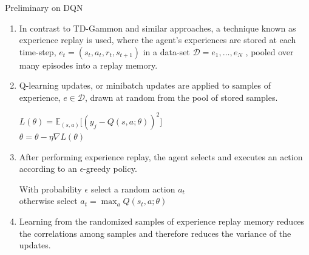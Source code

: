 \begin{frame}{Preliminary on DQN \cite{DBLP:journals/corr/MnihKSGAWR13}}
\begin{enumerate}
    \item In contrast to TD-Gammon and similar approaches, a technique known as experience replay is used, where the agent’s experiences are stored at each time-step, $e_t = (s_t, a_t, r_t, s_{t+1})$ in a data-set $\mathcal{D} = e_1, \dots, e_N$ , pooled over many episodes into a replay memory.
    \item Q-learning updates, or minibatch updates are applied to samples of experience, $e \in \mathcal{D}$, drawn at random from the pool of stored samples.
    \begin{center}
        $L(\theta) = \mathbb{E}_{(s,a)}\Big[(y_j − Q(s , a ; \theta))^2\Big]$\\
        $\theta = \theta - \eta \nabla L(\theta)$
    \end{center}
    \item After performing experience replay, the agent selects and executes an action according to an $\epsilon$-greedy policy.
    \begin{center}
        With probability $\epsilon$ select a random action $a_t$\\
        otherwise select $a_t = \max_a Q(s_t, a; \theta)$
    \end{center}
    \item Learning from the randomized samples of experience replay memory reduces the correlations among samples and therefore reduces the variance of the updates.
\end{enumerate}
\end{frame}

